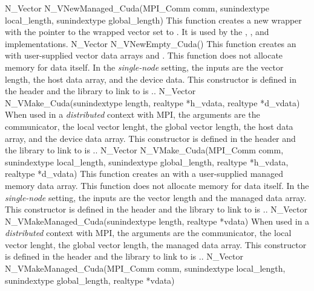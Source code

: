 {
  N\_Vector N\_VNewManaged\_Cuda(MPI\_Comm comm, sunindextype local\_length,
  sunindextype global\_length)
}
{
  This function creates a new {\nvector} wrapper with the pointer to
  the wrapped {\cuda} vector set to . It is used by the
  , , and 
  implementations.
}
{
  N\_Vector N\_VNewEmpty\_Cuda()
}
{
  This function creates an {\nveccuda} with user-supplied vector data arrays
   and . This function does not allocate memory for
  data itself.
}
{
  In the \textit{single-node} setting, the inputs are the vector length, the
  host data array, and the device data. This constructor is defined in the
  header  and the library to link to is
  ..
}
{
  N\_Vector N\_VMake\_Cuda(sunindextype length, realtype *h\_vdata,
  realtype *d\_vdata)
}
{
  When used in a \textit{distributed} context with MPI, the arguments are the
  {\mpi} communicator, the local vector lenght, the global vector length, the
  host data array, and the device data array. This constructor is defined in the
  header  and the library to link to is
  ..
}
{
  N\_Vector N\_VMake\_Cuda(MPI\_Comm comm, sunindextype local\_length,
  sunindextype global\_length, realtype *h\_vdata,
  realtype *d\_vdata)
}
{
  This function creates an {\nveccuda} with a user-supplied managed memory data
  array. This function does not allocate memory for data itself.
}
{
  In the \textit{single-node} setting, the inputs are the vector length and the
  managed data array. This constructor is defined in the header
   and the library to link to is
  ..
}
{
  N\_Vector N\_VMakeManaged\_Cuda(sunindextype length, realtype *vdata)
}
{
  When used in a \textit{distributed} context with MPI, the arguments are the
  {\mpi} communicator, the local vector lenght, the global vector length, the
  managed data array. This constructor is defined in the header
   and the library to link to is
  ..
}
{
  N\_Vector N\_VMakeManaged\_Cuda(MPI\_Comm comm, sunindextype local\_length,
  sunindextype global\_length, realtype *vdata)
}


